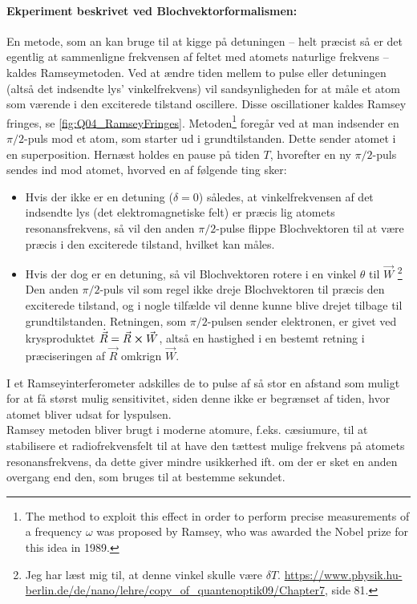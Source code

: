\paragraph{Ekperiment beskrivet ved Blochvektorformalismen:} En metode, som an kan bruge til at kigge på detuningen -- helt præcist så er det egentlig at sammenligne frekvensen af feltet med atomets naturlige frekvens -- kaldes \textsf{Ramseymetoden}. Ved at ændre tiden mellem to pulse eller detuningen (altså det indsendte lys' vinkelfrekvens) vil sandsynligheden for at måle et atom som værende i den exciterede tilstand oscillere. Disse oscillationer kaldes \textsf{Ramsey fringes}, se \cref{fig:Q04_RamseyFringes}. Metoden\footnote{The method to exploit this effect in order to perform precise measurements of a frequency $\omega$ was proposed by Ramsey, who was awarded the Nobel prize for this idea in 1989.} foregår ved at man indsender en $\pi/2$-puls mod et atom, som starter ud i grundtilstanden. Dette sender atomet i en superposition. Hernæst holdes en pause på tiden $T$, hvorefter en ny $\pi/2$-puls sendes ind mod atomet, hvorved en af følgende ting sker:
\begin{itemize}
    \item Hvis der ikke er en detuning ($\delta = 0$) således, at vinkelfrekvensen af det indsendte lys (det elektromagnetiske felt) er præcis lig atomets resonansfrekvens, så vil den anden $\pi/2$-pulse flippe Blochvektoren til at være præcis i den exciterede tilstand, hvilket kan måles.
    \item Hvis der dog er en detuning, så vil Blochvektoren rotere i en vinkel $\theta$ til $\Vec{W}$ \footnote{Jeg har læst mig til, at denne vinkel skulle være $\delta T$. \url{https://www.physik.hu-berlin.de/de/nano/lehre/copy_of_quantenoptik09/Chapter7}, side 81.} Den anden $\pi/2$-puls vil som regel ikke dreje Blochvektoren til præcis den exciterede tilstand, og i nogle tilfælde vil denne kunne blive drejet tilbage til grundtilstanden. Retningen, som $\pi/2$-pulsen sender elektronen, er givet ved krysproduktet $\Dot{\Vec{R}} = \Vec{R} \cross \Vec{W}$, altså en hastighed i en bestemt retning i præciseringen af $\Vec{R}$ omkrign $\Vec{W}$.
\end{itemize}
I et Ramseyinterferometer adskilles de to pulse af så stor en afstand som muligt for at få størst mulig sensitivitet, siden denne ikke er begrænset af tiden, hvor atomet bliver udsat for lyspulsen.\\
Ramsey metoden bliver brugt i moderne atomure, f.eks. cæsiumure, til at stabilisere et radiofrekvensfelt til at have den tættest mulige frekvens på atomets resonansfrekvens, da dette giver mindre usikkerhed ift. om der er sket en anden overgang end den, som bruges til at bestemme sekundet.

